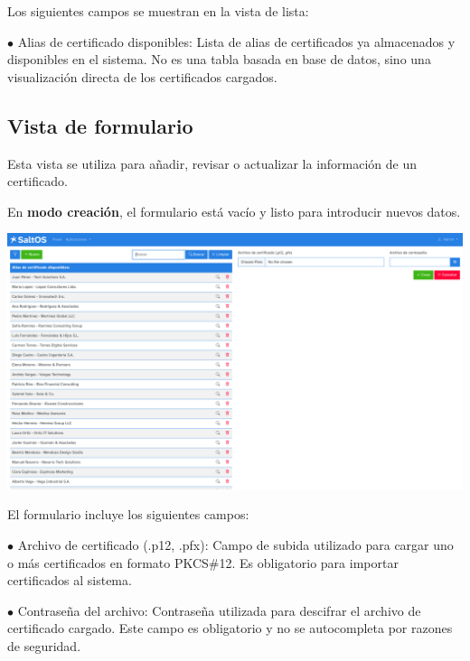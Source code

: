 \documentclass[a4paper]{article}
\begin{document}
Los siguientes campos se muestran en la vista de lista:

\begin{compactitem}
\item[\color{myblue}$\bullet$] Alias de certificado disponibles: Lista de alias de certificados ya almacenados y disponibles en el sistema. No es una tabla basada en base de datos, sino una visualización directa de los certificados cargados.
\end{compactitem}

\hypertarget{toc4}{}
\subsection{Vista de formulario}

Esta vista se utiliza para añadir, revisar o actualizar la información de un certificado.

En \textbf{modo creación}, el formulario está vacío y listo para introducir nuevos datos.

\begin{center}\includegraphics[width=1\textwidth]{../ujest/snaps/test-screenshots-js-screenshots-certs-certs-create-es-es-1-snap.png}\end{center}

El formulario incluye los siguientes campos:

\begin{compactitem}
\item[\color{myblue}$\bullet$] Archivo de certificado (.p12, .pfx): Campo de subida utilizado para cargar uno o más certificados en formato PKCS\#12. Es obligatorio para importar certificados al sistema.
\item[\color{myblue}$\bullet$] Contraseña del archivo: Contraseña utilizada para descifrar el archivo de certificado cargado. Este campo es obligatorio y no se autocompleta por razones de seguridad.
\end{compactitem}
\end{document}

